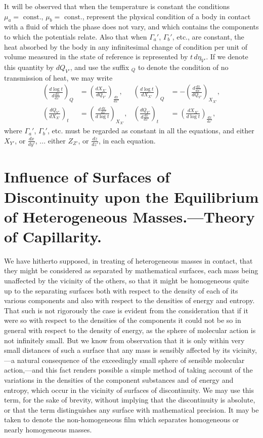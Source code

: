 \documentclass[12pt]{article}
\begin{document}
{It will be observed that when the temperature is constant the conditions  $\mu_a = \text{ const.}$, $\mu_b = \text{ const.}$, represent the physical condition of a body in contact with a fluid of which the phase does not vary, and which contains the components to which the potentials relate. Also that when $\Gamma_a'$, $\Gamma_b'$, etc., are constant, the heat absorbed by the body in any infinitesimal change of condition per unit of volume measured in the state of reference is represented by $t\,d\eta_{V'}$. If we denote this quantity by $dQ_{V'}$, and use the suffix $_Q$ to denote the condition of no transmission of heat, we may write
\begin{align}
\left( \frac{d \log t}{d\frac{dx}{dx'}}\right)_{Q} &= \left(\frac{dX_{X'}}{dQ_{V'}} \right)_{\frac{dx}{dx'}},     & 
\left( \frac{d \log t}{dX_{X'}}\right)_{Q} &=  -\left(\frac{d\frac{dx}{dx'}}{dQ_{V'}} \right)_{X_{X'}},    \label{474} \\
\left( \frac{d Q_{V'}}{d X_{X'}}\right)_{t} &= \left(\frac{d\frac{dx}{dx'}}{d \log t} \right)_{X_{X'}},     &    
\left( \frac{d Q_{V'}}{d \frac{dx}{dx'}}\right)_{t} &= \left(\frac{d X_{X'}}{d \log t} \right)_{\frac{dx}{dx'}},   \label{475} 
\end{align}
where $\Gamma_a'$, $\Gamma_b'$, etc. must be regarded as constant in all the equations, and either $X_{Y'}$, or $\frac{dx}{dy'}$, ... either $Z_{Z'}$, or $\frac{dz}{dz'}$, in each equation.

\section{Influence of Surfaces of Discontinuity upon the Equilibrium of Heterogeneous Masses.---Theory of Capillarity.}

We have hitherto supposed, in treating of heterogeneous masses in contact, that they might be considered as separated by mathematical surfaces, each mass being unaffected by the vicinity of the others, so that it might be homogeneous quite up to the separating surfaces both with respect to the density of each of its various components and also with respect to the densities of energy and entropy. That such is not rigorously the case is evident from the consideration that if it were so with respect to the densities of the components it could not be so in general with respect to the density of energy, as the sphere of molecular action is not infinitely small. But we know from observation that it is only within very small distances of such a surface that any mass is sensibly affected by its vicinity,---a natural consequence of the exceedingly small sphere of sensible molecular action,---and this fact renders possible a simple method of taking account of the variations in the densities of the component substances and of energy and entropy, which occur in the vicinity of surfaces of discontinuity. We may use this term, for the sake of brevity, without implying that the discontinuity is absolute, or that the term distinguishes any surface with mathematical precision.  It may be taken to denote the non-homogeneous film which separates homogeneous or nearly homogeneous masses.


}
\end{document}
